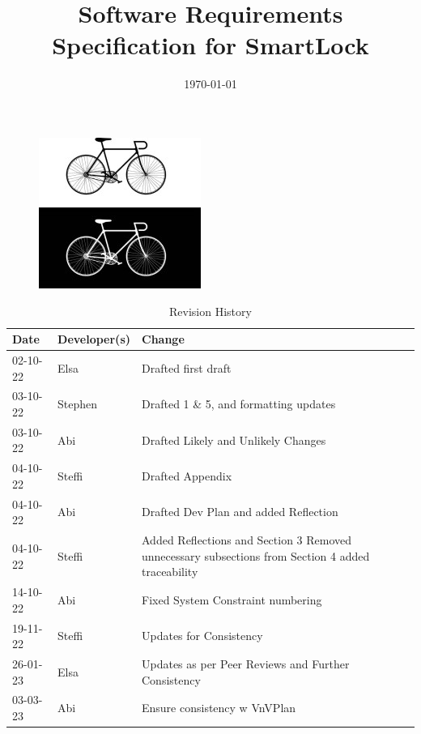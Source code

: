 \documentclass[12pt]{article}
\begin{document}
\title{Software Requirements Specification for SmartLock\\\progname} 
\author{\authname}
\date{\today}
	
\maketitle
\thispagestyle{empty}
\begin{figure}[h!]
  \centering
  \includegraphics[width=0.4\linewidth]{../BikeLogo.jpg}
\end{figure}

\newpage
{}
\begin{table}[hp]
\caption{Revision History} \label{TblRevisionHistory}
\begin{tabularx}{\textwidth}{llX}
\toprule
\textbf{Date} & \textbf{Developer(s)} & \textbf{Change}\\
\midrule
02-10-22 & Elsa & Drafted first draft\\
03-10-22 & Stephen & Drafted 1 \& 5, and formatting updates\\
03-10-22 & Abi & Drafted Likely and Unlikely Changes\\
04-10-22 & Steffi & Drafted Appendix\\
04-10-22 & Abi & Drafted Dev Plan and added Reflection\\
04-10-22 & Steffi & Added Reflections and Section 3 Removed unnecessary subsections from Section 4 added traceability\\
14-10-22 & Abi & Fixed System Constraint numbering\\
19-11-22 & Steffi & Updates for Consistency\\
26-01-23 & Elsa & Updates as per Peer Reviews and Further Consistency\\
03-03-23 & Abi & Ensure consistency w VnVPlan
\bottomrule
\end{tabularx}
\end{table}

\newpage


\tableofcontents
\end{document}
